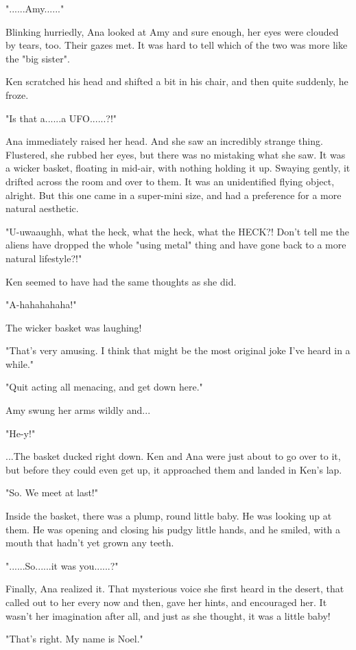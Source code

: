 \documentclass[
]{article}
\begin{document}
"......Amy......"

Blinking hurriedly, Ana looked at Amy and sure enough, her eyes were
clouded by tears, too. Their gazes met. It was hard to tell which of the
two was more like the "big sister".

Ken scratched his head and shifted a bit in his chair, and then quite
suddenly, he froze.

"Is that a......a UFO......?!"

Ana immediately raised her head. And she saw an incredibly strange
thing. Flustered, she rubbed her eyes, but there was no mistaking what
she saw. It was a wicker basket, floating in mid-air, with nothing
holding it up. Swaying gently, it drifted across the room and over to
them. It was an unidentified flying object, alright. But this one came
in a super-mini size, and had a preference for a more natural aesthetic.

"U-uwaaughh, what the heck, what the heck, what the HECK?! Don't tell me
the aliens have dropped the whole "using metal" thing and have gone back
to a more natural lifestyle?!"

Ken seemed to have had the same thoughts as she did.

"A-hahahahaha!"

The wicker basket was laughing!

"That's very amusing. I think that might be the most original joke I've
heard in a while."

"Quit acting all menacing, and get down here."

Amy swung her arms wildly and...

"He-y!"

...The basket ducked right down. Ken and Ana were just about to go over
to it, but before they could even get up, it approached them and landed
in Ken's lap.

"So. We meet at last!"

Inside the basket, there was a plump, round little baby. He was looking
up at them. He was opening and closing his pudgy little hands, and he
smiled, with a mouth that hadn't yet grown any teeth.

"......So......it was you......?"

Finally, Ana realized it. That mysterious voice she first heard in the
desert, that called out to her every now and then, gave her hints, and
encouraged her. It wasn't her imagination after all, and just as she
thought, it was a little baby!

"That's right. My name is Noel."
\end{document}
